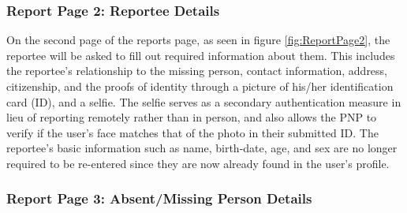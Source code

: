 \subsubsection{Report Page 2: Reportee Details}

On the second page of the reports page, as seen in figure \ref{fig:ReportPage2}, the reportee will be asked to fill out required information about them. This includes the reportee's relationship to the missing person, contact information, address, citizenship, and the proofs of identity through a picture of his/her identification card (ID), and a selfie. The selfie serves as a secondary authentication measure in lieu of reporting remotely rather than in person, and also allows the PNP to verify if the user's face matches that of the photo in their submitted ID. The reportee's basic information such as name, birth-date, age, and sex are no longer required to be re-entered since they are now already found in the user's profile. 

\subsubsection{Report Page 3: Absent/Missing Person Details}


